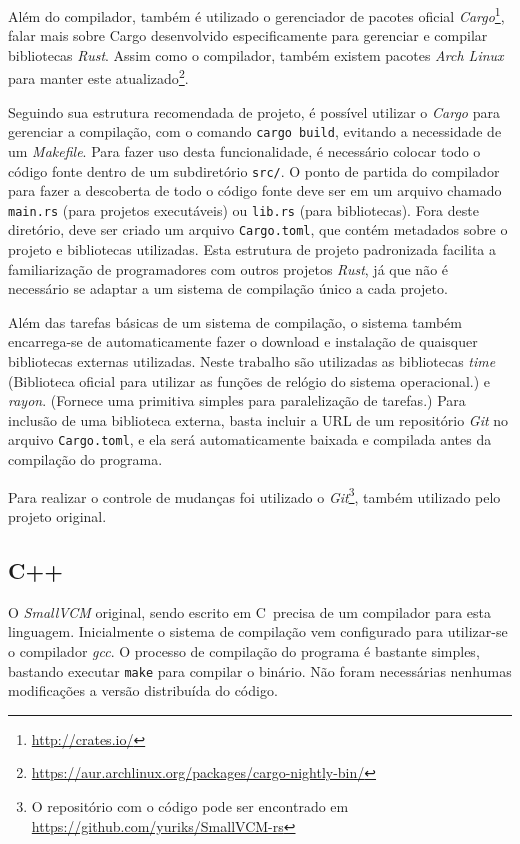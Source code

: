 \documentclass[tg]{mdtufsm}
\def\Cpp{{C\nolinebreak[4]\raisebox{.20ex}{\small\bf++}}}
\newcommand{\todo}[1]{\textsf{\color{red}#1}}
\begin{document}
Além do compilador, também é utilizado o gerenciador de pacotes oficial \emph{Cargo}\footnote{\url{http://crates.io/}}, \todo{falar mais sobre Cargo} desenvolvido especificamente para gerenciar e compilar bibliotecas \emph{Rust}. Assim como o compilador, também existem pacotes \emph{Arch Linux} para manter este atualizado\footnote{\url{https://aur.archlinux.org/packages/cargo-nightly-bin/}}.

Seguindo sua estrutura recomendada de projeto, é possível utilizar o \emph{Cargo} para gerenciar a compilação, com o comando \texttt{cargo build}, evitando a necessidade de um \emph{Makefile}. Para fazer uso desta funcionalidade, é necessário colocar todo o código fonte dentro de um subdiretório \texttt{src/}. O ponto de partida do compilador para fazer a descoberta de todo o código fonte deve ser em um arquivo chamado \texttt{main.rs} (para projetos executáveis) ou \texttt{lib.rs} (para bibliotecas). Fora deste diretório, deve ser criado um arquivo \texttt{Cargo.toml}, que contém metadados sobre o projeto e bibliotecas utilizadas. Esta estrutura de projeto padronizada facilita a familiarização de programadores com outros projetos \emph{Rust}, já que não é necessário se adaptar a um sistema de compilação único a cada projeto.

Além das tarefas básicas de um sistema de compilação, o sistema também encarrega-se de automaticamente fazer o download e instalação de quaisquer bibliotecas externas utilizadas. Neste trabalho são utilizadas as bibliotecas \emph{time} (Biblioteca oficial para utilizar as funções de relógio do sistema operacional.) e \emph{rayon}. (Fornece uma primitiva simples para paralelização de tarefas.) Para inclusão de uma biblioteca externa, basta incluir a URL de um repositório \emph{Git} no arquivo \texttt{Cargo.toml}, e ela será automaticamente baixada e compilada antes da compilação do programa.

Para realizar o controle de mudanças foi utilizado o \emph{Git}\footnote{O repositório com o código pode ser encontrado em \url{https://github.com/yuriks/SmallVCM-rs}}, também utilizado pelo projeto original.

\subsection{C++}

O \emph{SmallVCM} original, sendo escrito em \Cpp\ precisa de um compilador para esta linguagem. Inicialmente o sistema de compilação vem configurado para utilizar-se o compilador \emph{gcc}. O processo de compilação do programa é bastante simples, bastando executar \texttt{make} para compilar o binário. Não foram necessárias nenhumas modificações a versão distribuída do código.
\end{document}
